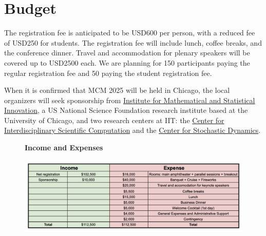\documentclass{article}
\begin{document}
\section{Budget}
The registration fee is anticipated to be USD600 per person, with a reduced fee of USD250 for students.  The registration fee will include lunch, coffee breaks, and the conference dinner. Travel and accommodation for plenary speakers will be covered up to USD2500 each.  We are planning for 150 participants paying the regular registration fee and 50 paying the student registration fee.

When it is confirmed that MCM 2025 will be held in Chicago, the local organizers will seek sponsorship from \href{https://www.imsi.institute}{Institute for Mathematical and Statistical Innovation}, a US National Science Foundation research institute based at the University of Chicago, and two research centers at IIT: the  \href{https://cos.iit.edu/cisc/}{Center for Interdisciplinary Scientific Computation} and the \href{https://mypages.iit.edu/~duan/LSD.html}{Center for Stochastic Dynamics}.






\begin{figure}[h]
    \centering
    {\large \textbf{Income and Expenses}}
    
    \includegraphics[width =.95\textwidth]{MCMBudgetv2.png}
\end{figure}
\end{document}
